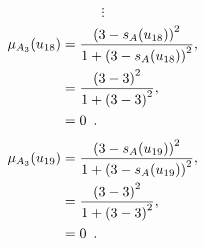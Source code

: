 \documentclass[a4paper,openany]{book}
\begin{document}
				\[
					\vdots
				\]
				\begin{align}
					\mu_{A_3}(u_{18}) &= \frac{\left(3-s_A(u_{18})\right)^2}{1 + \left(3-s_A(u_{18})\right)^2} ,\\
					&= \frac{\left(3-3\right)^2}{1 + \left(3-3\right)^2} \notag ,\\
					&= 0 \enspace. \notag
				\end{align}
				\begin{align}
					\mu_{A_3}(u_{19}) &= \frac{\left(3-s_A(u_{19})\right)^2}{1 + \left(3-s_A(u_{19})\right)^2} ,\\
					&= \frac{\left(3-3\right)^2}{1 + \left(3-3\right)^2} \notag ,\\
					&= 0 \enspace. \notag
				\end{align}
\end{document}
